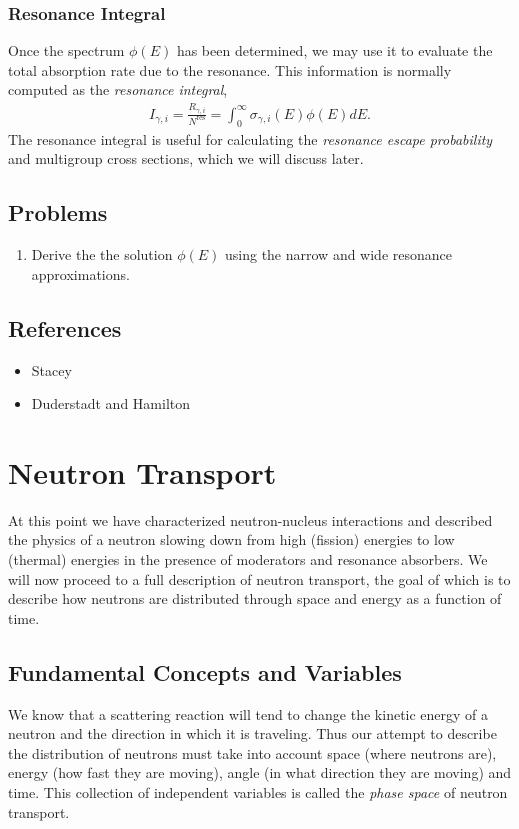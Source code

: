 \documentclass[11pt]{article}
\begin{document}
\subsubsection{Resonance Integral}
\label{sec:orgheadline37}
Once the spectrum \(\phi(E)\) has been determined, we may use it to evaluate the total absorption rate due to the resonance.  This information is normally computed as the \emph{resonance integral},
\begin{align}
  I_{\gamma,i} = \frac{R_{\gamma,i}}{N^\text{res}} = \int_0^\infty \sigma_{\gamma,i}(E) \phi(E) dE.
\end{align}
The resonance integral is useful for calculating the \emph{resonance escape probability} and multigroup cross sections, which we will discuss later.
\subsection{Problems}
\label{sec:orgheadline39}
\begin{enumerate}
\item Derive the the solution \(\phi(E)\) using the narrow and wide resonance approximations.
\end{enumerate}
\subsection{References}
\label{sec:orgheadline40}
\begin{itemize}
\item Stacey
\item Duderstadt and Hamilton
\end{itemize}
\section{Neutron Transport}
\label{sec:orgheadline59}
At this point we have characterized neutron-nucleus interactions and described the physics of a neutron slowing down from high (fission) energies to low (thermal) energies in the presence of moderators and resonance absorbers.  We will now proceed to a full description of neutron transport, the goal of which is to describe how neutrons are distributed through space and energy as a function of time.

\subsection{Fundamental Concepts and Variables}
\label{sec:orgheadline45}
We know that a scattering reaction will tend to change the kinetic energy of a neutron and the direction in which it is traveling.  Thus our attempt to describe the distribution of neutrons must take into account space (where neutrons are), energy (how fast they are moving), angle (in what direction they are moving) and time.  This collection of independent variables is called the \emph{phase space} of neutron transport.
\end{document}

